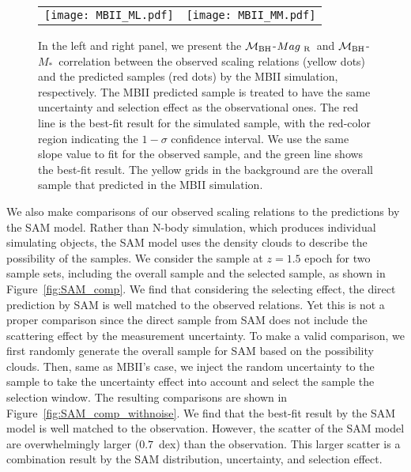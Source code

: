 \documentclass{natureprintstyle}
\newcommand{\mbh}{$\mathcal M_{\rm BH}$}
\newcommand{\mr}{$Mag_{\rm ~R}$}
\newcommand{\mstar}{{$M_*$}}
\newcommand{\ding}[1]{\textcolor{red}{[{\bf Xuheng}: #1]}}
\begin{document}
\begin{figure*}[t]%
\begin{tabular}{c c}
\texttt{[image: MBII\_ML.pdf]} &
\texttt{[image: MBII\_MM.pdf]} \\
\end{tabular}
\caption{  In the left and right panel, we present the \mbh-\mr\ and \mbh-\mstar\ correlation between the observed scaling relations (yellow dots) and the predicted samples (red dots) by the MBII simulation, respectively. The MBII predicted sample is treated to have the same uncertainty and selection effect as the observational ones. The red line is the best-fit result for the simulated sample, with the red-color region indicating the $1-\sigma$ confidence interval. We use the same slope value to fit for the observed sample, and the green line shows the best-fit result. The yellow grids in the background are the overall sample that predicted in the MBII simulation.  %
}
\label{fig:MBII_comp}
\end{figure*}

We also make comparisons of our observed scaling relations to the predictions by the SAM model. Rather than N-body simulation, which produces individual simulating objects, the SAM model uses the density clouds to describe the possibility of the samples. We consider the sample at $z=1.5$ epoch for two sample sets, including the overall sample and the selected sample, as shown in Figure~\ref{fig:SAM_comp}. We find that considering the selecting effect, the direct prediction by SAM is well matched to the observed relations.
Yet this is not a proper comparison since the direct sample from SAM does not include the scattering effect by the measurement uncertainty. To make a valid comparison, we first randomly generate the overall sample for SAM based on the possibility clouds. Then, same as MBII's case, we inject the random uncertainty to the sample to take the uncertainty effect into account and select the sample the selection window. The resulting comparisons are shown in Figure~\ref{fig:SAM_comp_withnoise}. We find that the best-fit result by the SAM model is well matched to the observation. However, the scatter of the SAM model are overwhelmingly larger ($0.7$~dex) than the observation. This larger scatter is a combination result by the SAM distribution, uncertainty, and selection effect.  
\end{document}
